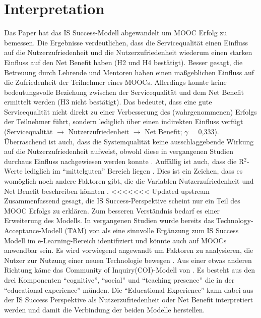 \section{Interpretation}
\label{sec:vergleich}
Das Paper hat das IS Success-Modell abgewandelt um MOOC Erfolg zu bemessen.  
Die Ergebnisse verdeutlichen, dass die Servicequalität einen Einfluss auf die Nutzerzufriedenheit und die Nutzerzufriedenheit wiederum einen starken Einfluss auf den Net Benefit haben (H2 und H4 bestätigt). Besser gesagt, die Betreuung durch Lehrende und Mentoren haben einen maßgeblichen Einfluss auf die Zufriedenheit der Teilnehmer eines MOOCs. Allerdings konnte keine bedeutungsvolle Beziehung zwischen der Servicequalität und dem Net Benefit ermittelt werden (H3 nicht bestätigt). Das bedeutet, dass eine gute Servicequalität nicht direkt zu einer Verbesserung des (wahrgenommenen) Erfolgs der Teilnehmer führt, sondern lediglich über einen indirekten Einfluss verfügt (Servicequalität $\rightarrow$ Nutzerzufriedenheit $\rightarrow$ Net Benefit; $\gamma$ = 0,333). Überraschend ist auch, dass die Systemqualität keine ausschlaggebende Wirkung auf die Nutzerzufriedenheit aufweist, obwohl diese in vergangenen Studien durchaus Einfluss nachgewiesen werden konnte \parencite{freeze2010success, islam2013investigating, mohammadi2015factors}. 
Auffällig ist auch, dass die R$^2$-Werte lediglich im "`mittelguten"' Bereich liegen \parencite[vgl.][S.323]{chin1998partial}. Dies ist ein Zeichen, dass es womöglich noch andere Faktoren gibt, die die Variablen Nutzerzufriedenheit und Net Benefit beschreiben könnten \parencite[vgl.][S.179]{freeze2010success}.  
<<<<<<< Updated upstream
Zusammenfassend gesagt, die IS Success-Perspektive scheint nur ein Teil des MOOC Erfolgs zu erklären. Zum besseren Verständnis bedarf es einer Erweiterung des Modells. In vergangenen Studien wurde bereits das Technology-Acceptance-Modell (TAM) von \textcite{bagozzi1992development} als eine sinnvolle Ergänzung zum IS Success Modell im e-Learning-Bereich identifiziert \parencite{mohammadi2015factors} und könnte auch auf MOOCs anwendbar sein. Es wird vorwiegend angewandt um Faktoren zu analysieren, die Nutzer zur Nutzung einer neuen Technologie bewegen \parencite[vgl.][S.702]{mohammadi2015factors}.  
Aus einer etwas anderen Richtung käme das Community of Inquiry(COI)-Modell von \textcite{garrison1999critical}. Es besteht aus den drei Komponenten "`cognitive"',  "`social"' und "`teaching presence"' die in der "`educational experience"'  münden. Die "`Educational Experience"' kann dabei aus der IS Success Perspektive als Nutzerzufriedenheit oder Net Benefit interpretiert werden und damit die Verbindung der beiden Modelle herstellen.  

